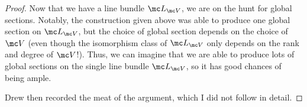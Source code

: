\documentclass{article}
\begin{document}
\begin{proof}
    Now that we have a line bundle $\mc L_{\mc V}$, we are on the hunt for global sections. Notably, the construction given above was able to produce one global section on $\mc L_{\mc V}$, but the choice of global section depends on the choice of $\mc V$ (even though the isomorphism class of $\mc L_{\mc V}$ only depends on the rank and degree of $\mc V$!). Thus, we can imagine that we are able to produce lots of global sections on the single line bundle $\mc L_{\mc V}$, so it has good chances of being ample.
    
    Drew then recorded the meat of the argument, which I did not follow in detail.
\end{proof}
\end{document}
